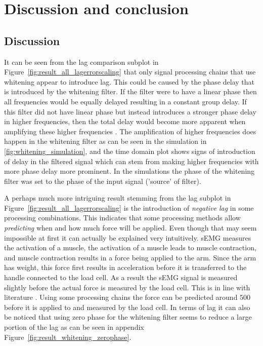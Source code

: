 \chapter{Discussion and conclusion}
\section{Discussion}

It can be seen from the lag comparison subplot in Figure~\ref{fig:result_all_lagerrorscaling} that only signal processing chains that use whitening appear to introduce lag. This could be caused by the phase delay that is introduced by the whitening filter. If the filter were to have a linear phase then all frequencies would be equally delayed resulting in a constant group delay. If this filter did not have linear phase but instead introduces a stronger phase delay in higher frequencies, then the total delay would become more apparent when amplifying these higher frequencies \cite{phase_delay_frequencies}. The amplification of higher frequencies does happen in the whitening filter as can be seen in the simulation in \ref{fig:whitening_simulation}, and the time domain plot shows signs of introduction of delay in the filtered signal which can stem from making higher frequencies with more phase delay more prominent. In the simulations the phase of the whitening filter was set to the phase of the input signal ('source' of filter).

A perhaps much more intriguing result stemming from the lag subplot in Figure~\ref{fig:result_all_lagerrorscaling} is the introduction of \textit{negative lag} in some processing combinations. This indicates that some processing methods allow \textit{predicting} when and how much force will be applied. Even though that may seem impossible at first it can actually be explained very intuitively. sEMG measures the activation of a muscle, the activation of a muscle leads to muscle contraction, and muscle contraction results in a force being applied to the arm. Since the arm has weight, this force first results in acceleration before it is transferred to the handle connected to the load cell. As a result the sEMG signal is measured slightly before the actual force is measured by the load cell. This is in line with literature \cite{human_robotics}. Using some processing chains the force can be predicted around \SI{500}{\milli\seconds} before it is applied to and measured by the load cell. In terms of lag it can also be noticed that using zero phase for the whitening filter seems to reduce a large portion of the lag as can be seen in appendix Figure~\ref{fig:result_whitening_zerophase}.

